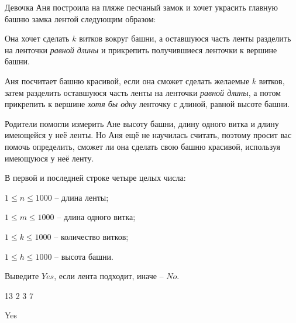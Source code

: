 
Девочка Аня построила на пляже песчаный замок и хочет украсить главную башню замка лентой следующим образом:

Она хочет сделать $k$ витков вокруг башни, а оставшуюся часть ленты разделить на ленточки \emph{равной длины} и прикрепить получившиеся ленточки к вершине башни.

Аня посчитает башню красивой, если она сможет сделать желаемые $k$ витков, затем разделить оставшуюся часть ленты на ленточки \emph{равной длины}, а потом прикрепить к вершине \emph{хотя бы одну} ленточку с длиной, равной высоте башни.

Родители помогли измерить Ане высоту башни, длину одного витка и длину имеющейся у неё ленты. Но Аня ещё не научилась считать, поэтому просит вас помочь определить, сможет ли она сделать свою башню красивой, используя имеющуюся у неё ленту.


В первой и последней строке четыре целых числа:

$1 \le n \le 1000$  -- длина ленты;

$1 \le m \le 1000$  -- длина одного витка;

$1 \le k \le 1000$  -- количество витков;

$1 \le h \le 1000$  -- высота башни.

\outputfmtSection

Выведите $Yes$, если лента подходит, иначе -- $No$.

\exampleSection


\begin{myverbbox}[\small]{\vinput}
13 2 3 7
\end{myverbbox}
\begin{myverbbox}[\small]{\voutput}
Yes
\end{myverbbox}

